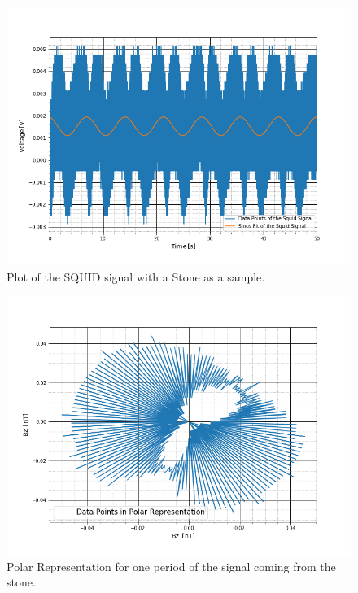\begin{figure}[ht]
	\includegraphics[scale=0.5]{Bild/P4_4}
	\centering
	\caption[SQUID signal of Stone 4]{Plot of the SQUID signal with a Stone as a sample.}
\end{figure}
\begin{figure}[ht]
	\includegraphics[scale=0.5]{Bild/Stein}
	\centering
	\caption[Polar Representation for a Stone]{Polar Representation for one period of the signal coming from the stone.}
\end{figure}
